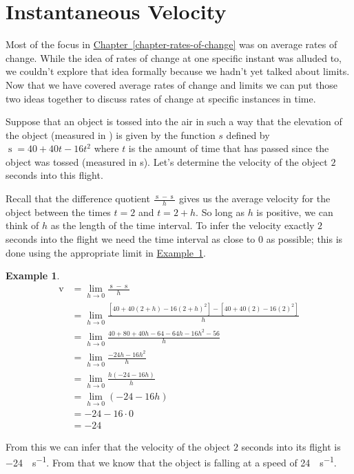 \documentclass[12pt,]{book}
\theoremstyle{plain}
\theoremstyle{definition}
\newtheorem{example}[theorem]{Example}
\numberwithin{equation}{section}
\newcommand{\fe}[2]{\mathop{{#1}{\left(#2\right)}}}
\begin{document}
\section[Instantaneous Velocity]{Instantaneous Velocity}\label{section-instantaneous-velocity}
Most of the focus in \hyperref[chapter-rates-of-change]{Chapter~\ref*{chapter-rates-of-change}} was on average rates of change. While the idea of rates of change at one specific instant was alluded to, we couldn't explore that idea formally because we hadn't yet talked about limits. Now that we have covered average rates of change and limits we can put those two ideas together to discuss rates of change at specific instances in time.%
\par
Suppose that an object is tossed into the air in such a way that the elevation of the object (measured in \si{\foot}) is given by the function \(s\) defined by \(\fe{s}{t}=40+40t-16t^2\) where \(t\) is the amount of time that has passed since the object was tossed (measured in \si{\second}). Let's determine the velocity of the object \(2\) seconds into this flight.%
\par
Recall that the difference quotient \(\frac{\fe{s}{2+h}-\fe{s}{2}}{h}\) gives us the average velocity for the object between the times \(t=2\) and \(t=2+h\). So long as \(h\) is positive, we can think of \(h\) as the length of the time interval. To infer the velocity exactly \(2\) seconds into the flight we need the time interval as close to \(0\) as possible; this is done using the appropriate limit in \hyperref[example-instantaneous-velocity]{Example~\ref*{example-instantaneous-velocity}}.%
\begin{example}\label{example-instantaneous-velocity}
\begin{align*}
\fe{v}{2}&=\lim_{h\to0}\frac{\fe{s}{2+h}-\fe{s}{2}}{h}\\
&=\lim_{h\to0}\frac{\left[40+40\left(2+h\right)-16\left(2+h\right)^2\right]-\left[40+40(2)-16(2)^2\right]}{h}\\
&=\lim_{h\to0}\frac{40+80+40h-64-64h-16h^2-56}{h}\\
&=\lim_{h\to0}\frac{-24h-16h^2}{h}\\
&=\lim_{h\to0}\frac{h\left(-24-16h\right)}{h}\\
&=\lim_{h\to0}\left(-24-16h\right)\\
&=-24-16\cdot0\\
&=-24
\end{align*}%
\par
From this we can infer that the velocity of the object \(2\) seconds into its flight is \SI{-24}{\foot\per\second}. From that we know that the object is falling at a speed of \SI{24}{\foot\per\second}.%
\end{example}
\typeout{************************************************}
\typeout{************************************************}
\end{document}
